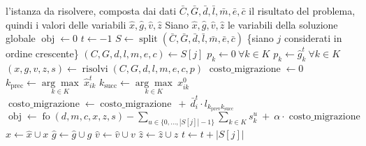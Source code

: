 \begin{algorithm}
    \caption{...}
    \label{alg:euristica-sempl}
    \begin{algorithmic}[1]
        \Require l'istanza da risolvere, composta dai dati $\bar{C}, \bar{G}, \bar{d}, \bar{l}, \bar{m}, \bar{e}, \bar{c}$
        \Ensure il risultato del problema, quindi i valori delle variabili $\hat{x}, \hat{g}, \hat{v}, \hat{z}$
        \State Siano $\hat{x}, \hat{g}, \hat{v}, \hat{z}$ le variabili della soluzione globale
        \State $\operatorname{obj} \gets 0$ \label{ciao}
        \State $t \gets -1$
        \State $S \gets \operatorname{split}(\bar{C}, \bar{G}, \bar{d}, \bar{l}, \bar{m}, \bar{e}, \bar{c})$
            \State \{siano $j$ considerati in ordine crescente\}
            \State $(C, G, d, l, m, e, c) \gets S[j]$
                \State $p_k \gets 0 ~ \forall k \in K$
            \Else
                \State $p_k \gets \hat{g}^t_k ~ \forall k \in K$
            \EndIf
            \State $(x, g, v, z, s) \gets \operatorname{risolvi}(C, G, d, l, m, e, c, p)$
            \State $\operatorname{costo\_migrazione} \gets 0$
                \State $k_{\operatorname{prec}} \gets \underset{k \in K}{\arg\max} ~ \hat{x}^t_{ik}$
                \State $k_{\operatorname{succ}} \gets \underset{k \in K}{\arg\max} ~ x^0_{ik}$
                    \State $\operatorname{costo\_migrazione} \gets \operatorname{costo\_migrazione} ~ + ~ \bar{d}^t_i \cdot l_{k_{\operatorname{prev}} k_{\operatorname{succ}}}$
                \EndIf
                \EndFor
            \EndIf
            \State $\operatorname{obj} \gets \operatorname{fo}(d, m, c, x, z, s) - \sum_{u \in \{0, \dots, |S[j]|-1\}}\sum_{k \in K} s^u_k ~ + ~ \alpha \cdot \operatorname{costo\_migrazione}$
            \State $\hat{x} \gets \hat{x} \cup x$
            \State $\hat{g} \gets \hat{g} \cup g$
            \State $\hat{v} \gets \hat{v} \cup v$
            \State $\hat{z} \gets \hat{z} \cup z$
            \State $t \gets t + |S[j]|$
        \EndFor
    \end{algorithmic}
\end{algorithm}
